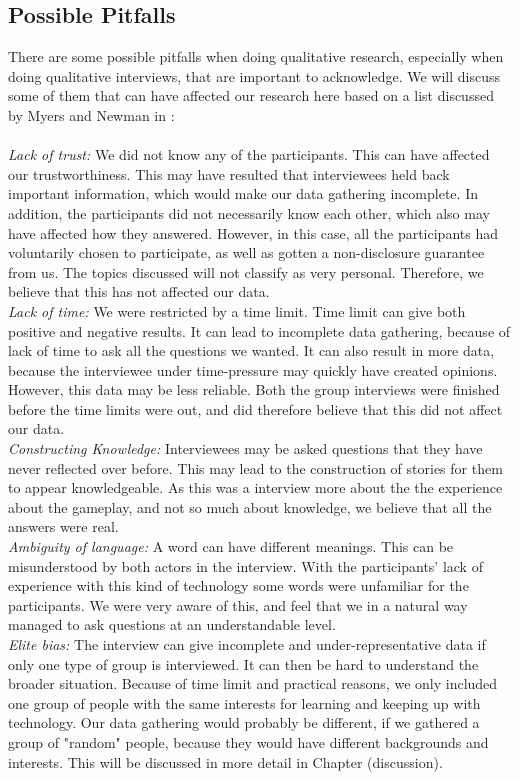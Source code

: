 \subsection{Possible Pitfalls}
There are some possible pitfalls when doing qualitative research, especially when doing qualitative interviews, that are important to acknowledge. We will discuss some of them that can have affected our research here based on a list discussed by Myers and Newman in \cite{interview}: \\ \\
\emph{Lack of trust:} We did not know any of the participants. This can have affected our trustworthiness. This may have resulted that interviewees held back important information, which would make our data gathering incomplete. In addition, the participants did not necessarily know each other, which also may have affected how they answered. However, in this case, all the participants had voluntarily chosen to participate, as well as gotten a non-disclosure guarantee from us. The topics discussed will not classify as very personal. Therefore, we believe that this has not affected our data.\\
\emph{Lack of time:} We were restricted by a time limit.  Time limit can give both positive and negative results. It can lead to incomplete data gathering, because of lack of time to ask all the questions we wanted. It can also result in more data, because the interviewee under time-pressure  may quickly have created opinions. However, this data may be less reliable. Both the group interviews were finished before the time limits were out, and did therefore believe that this did not affect our data.\\
\emph{Constructing Knowledge:} Interviewees may be asked questions that they have never reflected over before. This may lead to the construction of stories for them to appear knowledgeable. As this was a interview more about the the experience about the gameplay, and not so much about knowledge, we believe that all the answers were real. \\
\emph{Ambiguity of language:} A word can have different meanings. This can be misunderstood by both actors in the interview. With the participants' lack of experience with this kind of technology some words were unfamiliar for the participants. We were very aware of this, and feel that we in a natural way managed to ask questions at an understandable level.\\
\emph{Elite bias:} The interview can give incomplete and under-representative data if only one type of group is interviewed. It can then be hard to understand the broader situation. Because of time limit and practical reasons, we only included one group of people with the same interests for learning and keeping up with technology. Our data gathering would probably be different, if we gathered a group of "random" people, because they would have different backgrounds and interests. This will be discussed in more detail in Chapter (discussion).


